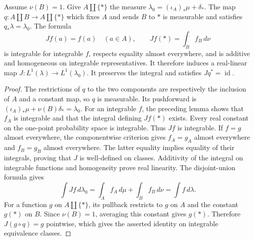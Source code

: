\begin{lemma}
\label{lem:probability-collapse}
\leanok
{}
Assume $\nu(B)=1$. Give $A\amalg\{*\}$ the measure
$\lambda_0=(\iota_A)_*\mu+\delta_*$.
The map $q:A\amalg B\to A\amalg\{*\}$ which fixes $A$ and sends
$B$ to $*$ is measurable and satisfies $q_*\lambda=\lambda_0$.
The formula
\[
 Jf(a)=f(a)\quad(a\in A),\qquad
 Jf(*)=\int_B f_B\,d\nu
\]
is integrable for integrable $f$, respects equality almost everywhere,
and is additive and homogeneous on integrable representatives. It therefore
induces a real-linear map $J:L^1(\lambda)\to L^1(\lambda_0)$.
It preserves the integral and satisfies $Jq^*=\operatorname{id}$.
\end{lemma}
\begin{proof}
The restrictions of $q$ to the two components are respectively the
inclusion of $A$ and a constant map, so $q$ is measurable. Its pushforward
is $(\iota_A)_*\mu+\nu(B)\delta_*=\lambda_0$.
For an integrable $f$, the preceding lemma shows that $f_A$ is integrable
and that the integral defining $Jf(*)$ exists. Every real constant on the
one-point probability space is integrable. Thus $Jf$ is integrable.
If $f=g$ almost everywhere, the componentwise criterion gives
$f_A=g_A$ almost everywhere and $f_B=g_B$ almost everywhere. The latter
equality implies equality of their integrals, proving that $J$ is
well-defined on classes. Additivity of the integral on integrable
functions and homogeneity prove real linearity. The disjoint-union formula
gives
\[
 \int Jf\,d\lambda_0
 =\int_A f_A\,d\mu+\int_B f_B\,d\nu
 =\int f\,d\lambda.
\]
For a function $g$ on $A\amalg\{*\}$, its pullback restricts to $g$
on $A$ and the constant $g(*)$ on $B$. Since $\nu(B)=1$, averaging this
constant gives $g(*)$. Therefore $J(g\circ q)=g$ pointwise, which gives
the asserted identity on integrable equivalence classes.
\end{proof}
